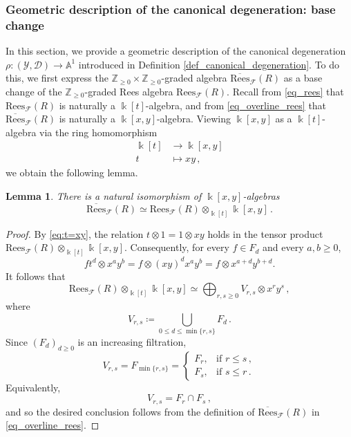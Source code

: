 \documentclass[12pt,letterpaper, reqno]{amsart}
\newtheorem{lemma}[theorem]{Lemma}
\theoremstyle{defstyle} \newtheorem{definition}[theorem]{Definition}
\theoremstyle{remark}
\numberwithin{equation}{section}
\numberwithin{figure}{section}
\newcommand{\cF} {\mathcal{F}}
\newcommand{\kk} {\Bbbk}
\newcommand{\A} {\mathbb{A}}
\newcommand{\ZZ} {\mathbb{Z}}
\newcommand{\cY} {\mathcal{Y}}
\newcommand{\cD} {\mathcal{D}}
\begin{document}
\subsubsection{Geometric description of the canonical degeneration: base change}
\label{sec_base_change}
In this section, we provide a geometric description of the canonical degeneration $\rho:(\cY, \cD) \rightarrow \A^1$ introduced in Definition \ref{def_canonical_degeneration}. To do this, we first express the $\ZZ_{\geq 0} \times \ZZ_{\geq 0}$-graded algebra $\overline{\mathrm{Rees}}_\cF(R)$ 
as a base change of the $\ZZ_{\geq 0}$-graded Rees algebra $\mathrm{Rees}_\cF(R)$. 
Recall from \eqref{eq_rees} that $\mathrm{Rees}_\cF(R)$ is naturally a $\kk[t]$-algebra,
and from \eqref{eq_overline_rees} that $\overline{\mathrm{Rees}}_\cF(R)$ is naturally a $\kk[x,y]$-algebra. Viewing $\kk[x,y]$ as a $\kk[t]$-algebra via the ring homomorphism
\begin{align}
\label{eq:t=xy}
    \kk[t] & \longrightarrow \kk[x,y] \\
    \nonumber
    t &\longmapsto xy \,,
\end{align}
we obtain the following lemma.

\begin{lemma}
\label{lem:isomprhismAtilde}
There is a natural isomorphism of $\kk[x,y]$-algebras
\[ \overline{\mathrm{Rees}}_\cF(R) \simeq \mathrm{Rees}_\cF(R) \otimes_{\kk[t]} \kk[x,y] \,.\]
\end{lemma}

\begin{proof}
By \eqref{eq:t=xy}, the relation
$t\otimes 1 = 1\otimes xy$
holds in the tensor product
$\mathrm{Rees}_{\mathcal F}(R)\otimes_{\kk[t]}\kk[x,y]$.
Consequently, for every \(f\in F_d\) and every \(a,b\ge 0\),
\[
f t^d\otimes x^a y^b
 = f\otimes (xy)^d x^a y^b
 = f\otimes x^{a+d}y^{b+d}.
\]
It follows that
\[
\mathrm{Rees}_{\mathcal F}(R)\otimes_{\kk[t]}\kk[x,y]
\simeq
\bigoplus_{r,s\ge0} V_{r,s}\otimes x^r y^s\,,
\]
where
\[
V_{r,s}
\coloneqq
\bigcup_{0\le d\le \min\{r,s\}} F_d\,.
\]
Since \((F_d)_{d\ge0}\) is an increasing filtration,
\[
V_{r,s}
=
F_{\min\{r,s\}}
=
\begin{cases}
F_r, & \text{if } r\le s\,,\\
F_s, & \text{if } s\le r\,.
\end{cases}
\]
Equivalently,
\[
V_{r,s}=F_r\cap F_s\,,
\]
and so the desired conclusion follows from the definition of
\(\overline{\mathrm{Rees}}_{\mathcal F}(R)\) in \eqref{eq_overline_rees}.
\end{proof}
\end{document}

